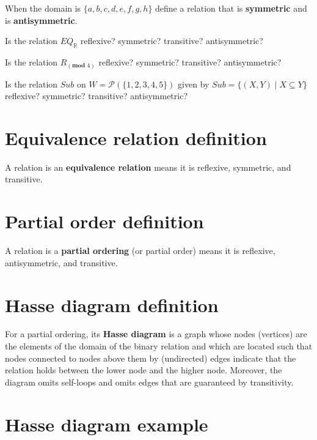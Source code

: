 \documentclass[12pt, oneside]{article}
\begin{document}
\vspace{80pt}


When the domain is $\{ a,b,c,d,e,f,g,h\}$ define a relation that is {\bf symmetric} and
is {\bf antisymmetric}.

\vspace{80pt}

Is the relation $EQ_{\mathbb{R}}$ reflexive? symmetric? transitive? antisymmetric?

\vspace{80pt}

Is the relation $R_{(\textbf{mod } 4)}$ reflexive? symmetric? transitive? antisymmetric?

\vspace{80pt}

Is the relation $Sub$ on $W = \mathcal{P}(\{1,2,3,4,5\})$ given by $Sub = \{ (X,Y) \mid X \subseteq Y \}$
reflexive? symmetric? transitive? antisymmetric?

\vspace{80pt}
 \vfill
\section*{Equivalence relation definition}


A relation is an {\bf equivalence relation} means it is reflexive, symmetric, and transitive. \vfill
\section*{Partial order definition}


A relation is a {\bf partial ordering} (or partial order) means 
it is reflexive, antisymmetric, and transitive. \vfill
\section*{Hasse diagram definition}


For a partial ordering, its {\bf Hasse diagram} is a graph whose nodes (vertices) are the elements of the 
domain of the binary relation and which are located such that nodes connected to nodes
above them by (undirected) edges indicate that the relation holds between the lower node and the higher node. 
Moreover, the diagram omits self-loops and omits edges that are guaranteed by transitivity.
 \vfill
\section*{Hasse diagram example}
\end{document}
